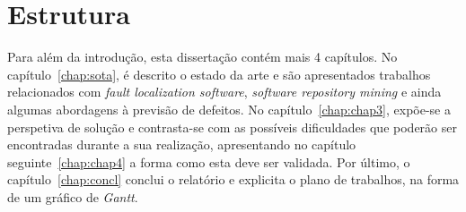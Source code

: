 \section{Estrutura} \label{sec:struct}

Para além da introdução, esta dissertação contém mais 4 capítulos.
No capítulo~\ref{chap:sota}, é descrito o estado da arte e são apresentados trabalhos relacionados com \emph{fault localization software}, \emph{software repository mining} e ainda algumas abordagens à previsão de defeitos. No capítulo~\ref{chap:chap3}, expõe-se a perspetiva de solução e contrasta-se com as possíveis dificuldades que poderão ser encontradas durante a sua realização, apresentando no capítulo seguinte~\ref{chap:chap4} a forma como esta deve ser validada. Por último, o capítulo~\ref{chap:concl} conclui o relatório e explicita o plano de trabalhos, na forma de um gráfico de \emph{Gantt}.
